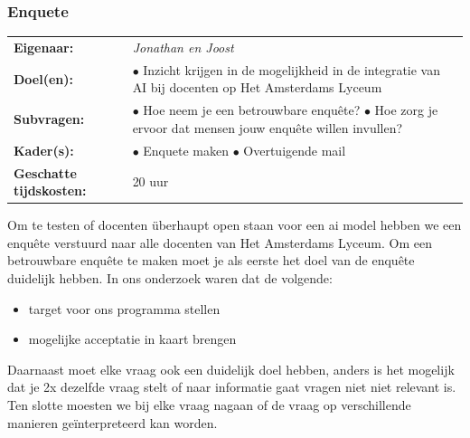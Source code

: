\documentclass[12pt]{article}
\begin{document}
\subsubsection{Enquete}
\begin{tabularx}{\linewidth}{ll}
    \textbf{Eigenaar: } & \textit{Jonathan en Joost} \\
    \textbf{Doel(en): } & 
        \makecell[tl]{
            $\bullet$ Inzicht krijgen in de mogelijkheid in de integratie van AI \\ bij docenten op Het Amsterdams Lyceum \\
        } \\
    \textbf{Subvragen: } & 
        \makecell[tl]{
            $\bullet$ Hoe neem je een betrouwbare enquête? \\
            $\bullet$ Hoe zorg je ervoor dat mensen jouw enquête willen invullen? \\
        }\\
    \textbf{Kader(s): } & 
        \makecell[tl]{
            $\bullet$ Enquete maken\\
            $\bullet$ Overtuigende mail\\
        }\\
    \parbox[t]{3cm}{\raggedright\textbf{Geschatte  tijdskosten:} } & 20 uur \\
\end{tabularx}
\begin{multicols}{2}
Om te testen of docenten überhaupt open staan voor een ai model hebben we een enquête verstuurd naar alle docenten van Het Amsterdams Lyceum. 
Om een betrouwbare enquête te maken moet je als eerste het doel van de enquête duidelijk hebben. In ons onderzoek waren dat de volgende:
\begin{minipage}{\linewidth}
\begin{itemize}
    \item target voor ons programma stellen
    \item mogelijke acceptatie in kaart brengen
\end{itemize}
\end{minipage}
Daarnaast moet elke vraag ook een duidelijk doel hebben, anders is het mogelijk dat je 2x dezelfde vraag stelt of naar informatie gaat vragen niet niet relevant is.\\
Ten slotte moesten we bij elke vraag nagaan of de vraag op verschillende manieren geïnterpreteerd kan worden.\\
\end{multicols}%
\end{document}
